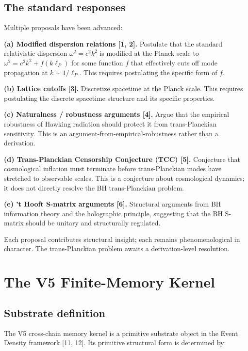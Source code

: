 \documentclass[11pt,a4paper]{article}
\begin{document}
\subsection{The standard responses}

Multiple proposals have been advanced:

\textbf{(a) Modified dispersion relations [1, 2].} Postulate that the standard relativistic dispersion $\omega^{2} = c^{2} k^{2}$ is modified at the Planck scale to $\omega^{2} = c^{2} k^{2} + f(k\ell_P)$ for some function $f$ that effectively cuts off mode propagation at $k \sim 1/\ell_P$. This requires postulating the specific form of $f$.

\textbf{(b) Lattice cutoffs [3].} Discretize spacetime at the Planck scale. This requires postulating the discrete spacetime structure and its specific properties.

\textbf{(c) Naturalness / robustness arguments [4].} Argue that the empirical robustness of Hawking radiation should protect it from trans-Planckian sensitivity. This is an argument-from-empirical-robustness rather than a derivation.

\textbf{(d) Trans-Planckian Censorship Conjecture (TCC) [5].} Conjecture that cosmological inflation must terminate before trans-Planckian modes have stretched to observable scales. This is a conjecture about cosmological dynamics; it does not directly resolve the BH trans-Planckian problem.

\textbf{(e) 't Hooft S-matrix arguments [6].} Structural arguments from BH information theory and the holographic principle, suggesting that the BH S-matrix should be unitary and structurally regulated.

Each proposal contributes structural insight; each remains phenomenological in character. The trans-Planckian problem awaits a derivation-level resolution.

\section{The V5 Finite-Memory Kernel}

\subsection{Substrate definition}

The V5 cross-chain memory kernel is a primitive substrate object in the Event Density framework [11, 12]. Its primitive structural form is determined by:
\end{document}
